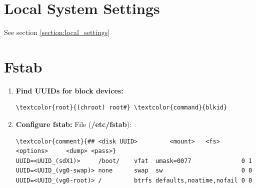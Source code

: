 \documentclass[10pt, a4paper, onecolumn, oneside, titlepage, openany]{book}
\begin{document}
\section{Local System Settings}
See section \ref{section:local_settings}

\section{Fstab}
\begin{enumerate}
    \item \textbf{Find UUIDs for block devices:}
\begin{Verbatim}[commandchars=\\\{\}]
\textcolor{root}{(chroot) root#} \textcolor{command}{blkid}
\end{Verbatim}
    \item \textbf{Configure fstab:}
\newline File (\textbf{\textcolor{file}{/etc/fstab}}):
\begin{Verbatim}[commandchars=\\\{\}]
\textcolor{comment}{## <disk UUID>         <mount>   <fs>  <options>     <dump> <pass>}
UUID=<UUID_(sdX1)>     /boot/    vfat  umask=0077              0 1
UUID=<UUID_(vg0-swap)> none      swap  sw                      0 0
UUID=<UUID_(vg0-root)> /         btrfs defaults,noatime,nofail 0 0
\end{Verbatim}
\end{enumerate}
\end{document}
